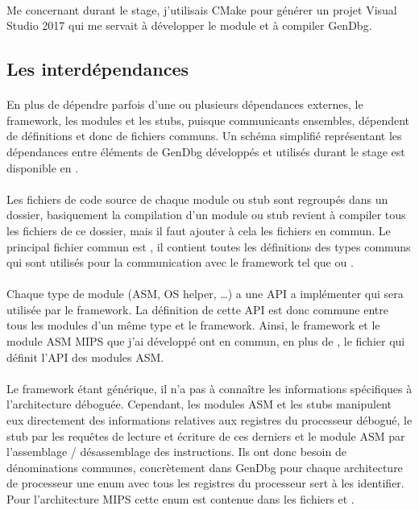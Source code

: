 \documentclass[11pt, book, english, french, standardlists]{upmethodology-document}
\begin{document}
				\paragraph*{}
					Me concernant durant le stage, j'utilisais CMake pour générer un projet Visual Studio 2017 qui me servait à développer le module et à compiler GenDbg.
			\subsection{Les interdépendances}
				\paragraph*{}
					En plus de dépendre parfois d'une ou plusieurs dépendances externes, le framework, les modules et les stubs, puisque communicants ensembles, dépendent de définitions et donc de fichiers communs. Un schéma simplifié représentant les dépendances entre éléments de GenDbg développés et utilisés durant le stage est disponible en .
				\paragraph*{}
					Les fichiers de code source de chaque module ou stub sont regroupés dans un dossier, basiquement la compilation d'un module ou stub revient à compiler tous les fichiers de ce dossier, mais il faut ajouter à cela les fichiers en commun. Le principal fichier commun est , il contient toutes les définitions des types communs qui sont utilisés pour la communication avec le framework tel que  ou .
				\paragraph*{}
					Chaque type de module (ASM, OS helper, \ldots) a une \gls{API} a implémenter qui sera utilisée par le framework. La définition de cette \gls{API} est donc commune entre tous les modules d'un même type et le framework. Ainsi, le framework et le module ASM \acrshort{MIPS} que j'ai développé ont en commun, en plus de , le fichier  qui définit l'\gls{API} des modules ASM.
				\paragraph*{}
					Le framework étant générique, il n'a pas à connaître les informations spécifiques à l'architecture déboguée. Cependant, les modules ASM et les stubs manipulent eux directement des informations relatives aux registres du processeur débogué, le stub par les requêtes de lecture et écriture de ces derniers et le module ASM par l'assemblage / désassemblage des instructions. Ils ont donc besoin de dénominations communes, concrètement dans GenDbg pour chaque architecture de processeur une enum avec tous les registres du processeur sert à les identifier. Pour l'architecture \acrshort{MIPS} cette enum est contenue dans les fichiers  et .
\end{document}
